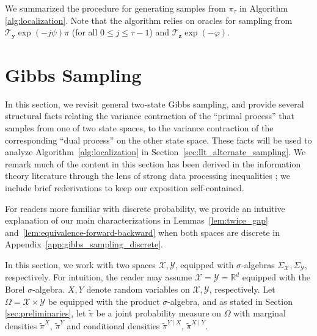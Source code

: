 \documentclass[11pt]{article}
\newcommand{\R}{\mathbb{R}}
\newcommand{\0}{\mathbf{0}}
\newcommand{\1}{\mathbf{1}}
\newcommand{\vy}{\mathbf{y}}
\newcommand{\vz}{\mathbf{z}}
\newcommand{\calX}{\mathcal{X}}
\newcommand{\calY}{\mathcal{Y}}
\newcommand{\vhi}{\varphi}
\begin{document}
We summarized the procedure for generating samples from $\pi_{\tau}$ in Algorithm \ref{alg:localization}.  Note that the algorithm relies on oracles for sampling from $\mathcal{T}_{\vy}\exp(-j\psi)\pi$ (for all $0 \le j \le \tau - 1$) and $\mathcal{T}_{\vz}\exp(-\vhi)$.
\section{Gibbs Sampling}\label{sec:gibbs_sampling}
In this section, we revisit general two-state Gibbs sampling, and provide several structural facts relating the variance contraction of the ``primal process'' that samples from one of two state spaces, to the variance contraction of the corresponding ``dual process'' on the other state space. These facts will be used to analyze Algorithm~\ref{alg:localization} in Section~\ref{sec:llt_alternate_sampling}. We remark much of the content in this section has been derived in the information theory literature through the lens of strong data processing inequalities \cite{Raginsky16,PolyanskiyW25}; we include brief rederivations to keep our exposition self-contained.

For readers more familiar with discrete probability, we provide an intuitive explanation of our main characterizations in Lemmas~\ref{lem:twice_gap} and~\ref{lem:equivalence-forward-backward} when both spaces are discrete in Appendix~\ref{app:gibbs_sampling_discrete}. 



In this section, we work with two spaces $\calX, \calY$, equipped with $\sigma$-algebras $\Sigma_\calX,\Sigma_\calY$, respectively. For intuition, the reader may assume $\calX=\calY=\R^d$ equipped with the Borel $\sigma$-algebra.  $X, Y$ denote random variables on $\calX, \calY$, respectively.  Let $\Omega=\calX\times\calY$ be equipped with the product $\sigma$-algebra, and as stated in Section \ref{sec:preliminaries}, let $\tilde{\pi}$ be a joint
probability measure on $\Omega$ with marginal densities $\tilde{\pi}^X$, $\tilde{\pi}^Y$ and conditional densities $\tilde{\pi}^{Y\mid X}$, $\tilde{\pi}^{X\mid Y}$.
\end{document}
